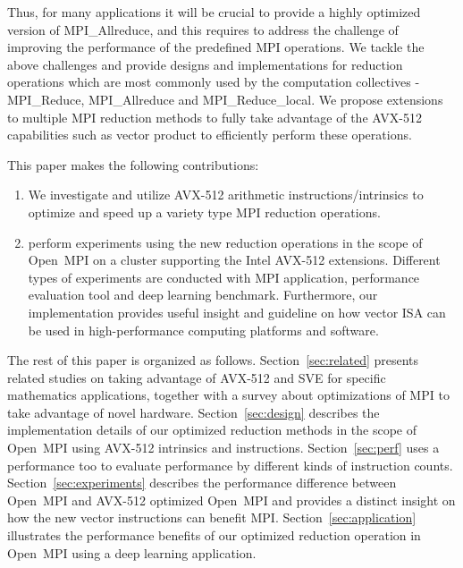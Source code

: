 \documentclass[sigconf]{acmart}
\newcommand{\ompi}[0]{Open~MPI\xspace}
\newcommand{\mpi}[0]{\textsc{MPI}\xspace}
\newcommand{\sve}[0]{\textsc{SVE}\xspace}
\begin{document}
Thus, for many applications it will be crucial to provide a highly optimized
version of MPI\_Allreduce, and this requires to address the challenge of improving the performance of the predefined MPI operations. We tackle the above challenges and provide designs and implementations
for reduction operations which are most commonly used by the computation
collectives - MPI\_Reduce, MPI\_Allreduce and MPI\_Reduce\_local.
We propose extensions to multiple \mpi reduction methods to fully take
advantage of the AVX-512 capabilities such as vector product to efficiently
perform these operations.

This paper makes the following contributions:
\begin{enumerate}
  \item We investigate and utilize AVX-512 arithmetic instructions/intrinsics to optimize and
  speed up a variety type \mpi reduction operations.
%
  \item perform experiments using the new reduction operations in the scope
  of \ompi on a cluster supporting the Intel AVX-512 extensions. Different types of
  experiments are conducted with \mpi application, performance evaluation tool and
  deep learning benchmark.
  Furthermore, our implementation provides useful insight and guideline on how vector
  ISA can be used in high-performance computing platforms and software.
\end{enumerate}

The rest of this paper is organized as follows.
Section~\ref{sec:related} presents related studies on taking advantage of AVX-512 and \sve for specific mathematics applications, together with a survey about optimizations of \mpi to take advantage of novel hardware.
Section~\ref{sec:design} describes the implementation details of our optimized reduction methods in the scope of \ompi using AVX-512 intrinsics and instructions.
Section~\ref{sec:perf} uses a performance too to evaluate performance by different kinds of instruction counts.
Section~\ref{sec:experiments} describes the performance difference between
\ompi and AVX-512 optimized \ompi and provides a distinct insight on how the
new vector instructions can benefit \mpi.
Section~\ref{sec:application} illustrates the performance benefits of our
optimized reduction operation in \ompi using a deep learning application.
\end{document}
